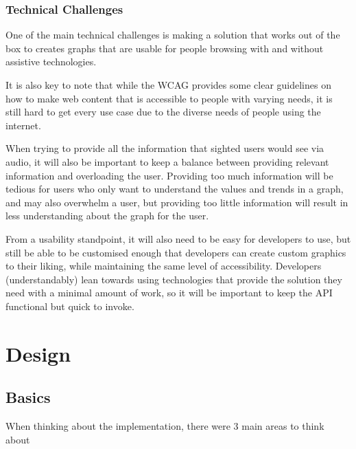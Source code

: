 \documentclass[ %
                    author={Aleena Baig},
                supervisor={Dr Simon Lock},
                    degree={BSc},
                     title={On Making Web Accessible Graphs},
                  subtitle={},
                      year={2019} ]{dissertation}
\begin{document}
\subsection{Technical Challenges}

One of the main technical challenges is making a solution that works out of the box to creates graphs that are usable for people browsing with and without assistive technologies.

It is also key to note that while the WCAG provides some clear guidelines on how to make web content that is accessible to people with varying needs, it is still hard to get every use case due to the diverse needs of people using the internet.

When trying to provide all the information that sighted users would see via audio, it will also be important to keep a balance between providing relevant information and overloading the user. Providing too much information will be tedious for users who only want to understand the values and trends in a graph, and may also overwhelm a user, but providing too little information will result in less understanding about the graph for the user.

From a usability standpoint, it will also need to be easy for developers to use, but still be able to be customised enough that developers can create custom graphics to their liking, while maintaining the same level of accessibility. Developers (understandably) lean towards using technologies that provide the solution they need with a minimal amount of work, so it will be important to keep the API functional but quick to invoke.



\chapter{Design}

\section{Basics}

When thinking about the implementation, there were 3 main areas to think about
\end{document}
